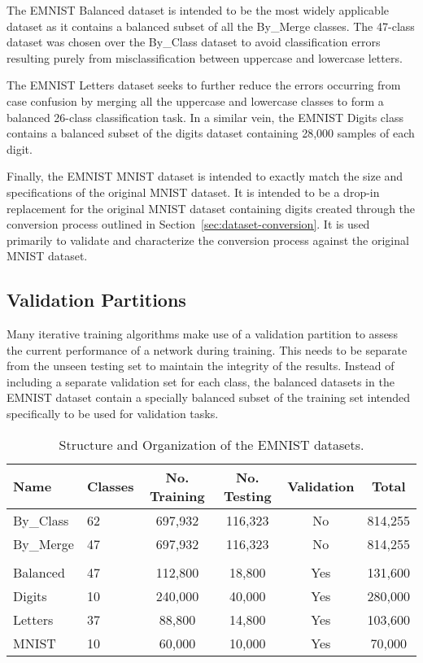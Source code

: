\documentclass[conference]{IEEEtran}
\begin{document}
The EMNIST Balanced dataset is intended to be the most widely applicable dataset as it contains a balanced subset of all the By\_Merge classes. The 47-class dataset was chosen over the By\_Class dataset to avoid classification errors resulting purely from misclassification between uppercase and lowercase letters. 

The EMNIST Letters dataset seeks to further reduce the errors occurring from case confusion by merging all the uppercase and lowercase classes to form a balanced 26-class classification task. In a similar vein, the EMNIST Digits class contains a balanced subset of the digits dataset containing 28,000 samples of each digit. 

Finally, the EMNIST MNIST dataset is intended to exactly match the size and specifications of the original MNIST dataset. It is intended to be a drop-in replacement for the original MNIST dataset containing digits created through the conversion process outlined in Section~\ref{sec:dataset-conversion}. It is used primarily to validate and characterize the conversion process against the original MNIST dataset.

\subsection{Validation Partitions}
\label{sec:methodology-validation-sets}

Many iterative training algorithms make use of a validation partition to assess the current performance of a network during training. This needs to be separate from the unseen testing set to maintain the integrity of the results. Instead of including a separate validation set for each class, the balanced datasets in the EMNIST dataset contain a specially balanced subset of the training set intended specifically to be used for validation tasks. 

\begin{table}[]
\centering
\caption{Structure and Organization of the EMNIST datasets.}
\label{tab:emnist-validation-composition}
\begin{tabular}{@{}llcccc@{}}
\toprule
Name & Classes & No. Training & No. Testing & Validation & Total \\ \midrule
By\_Class & 62 & 697,932 & 116,323 & No & 814,255 \\
By\_Merge & 47 & 697,932 & 116,323 & No & 814,255 \\
& & & & & \\
Balanced & 47 & 112,800 & 18,800 & Yes & 131,600 \\ 
Digits & 10 & 240,000 & 40,000 & Yes & 280,000 \\ 
Letters & 37 & 88,800 & 14,800 & Yes & 103,600 \\ 
MNIST & 10 & 60,000 & 10,000 & Yes & 70,000 \\
\bottomrule
\end{tabular}
\end{table}
\end{document}
